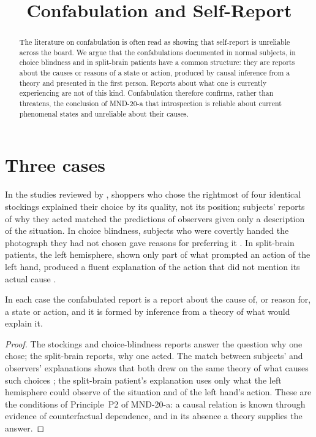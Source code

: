 \documentclass{situationist-preprint}
\title{Confabulation and Self-Report}
\begin{document}
\maketitle

\begin{abstract}
The literature on confabulation is often read as showing that self-report is unreliable across the board. We argue that the confabulations documented in normal subjects, in choice blindness and in split-brain patients have a common structure: they are reports about the causes or reasons of a state or action, produced by causal inference from a theory and presented in the first person. Reports about what one is currently experiencing are not of this kind. Confabulation therefore confirms, rather than threatens, the conclusion of MND-20-a that introspection is reliable about current phenomenal states and unreliable about their causes.
\end{abstract}

\section{Three cases}

In the studies reviewed by \citet{Nisbett1977}, shoppers who chose the rightmost of four identical stockings explained their choice by its quality, not its position; subjects' reports of why they acted matched the predictions of observers given only a description of the situation. In choice blindness, subjects who were covertly handed the photograph they had not chosen gave reasons for preferring it \citep{Johansson2005}. In split-brain patients, the left hemisphere, shown only part of what prompted an action of the left hand, produced a fluent explanation of the action that did not mention its actual cause \citep{Gazzaniga1978}.

\begin{proposition}\label{p:struct}
In each case the confabulated report is a report about the cause of, or reason for, a state or action, and it is formed by inference from a theory of what would explain it.
\end{proposition}

\begin{proof}
The stockings and choice-blindness reports answer the question why one chose; the split-brain reports, why one acted. The match between subjects' and observers' explanations shows that both drew on the same theory of what causes such choices \citep{Nisbett1977}; the split-brain patient's explanation uses only what the left hemisphere could observe of the situation and of the left hand's action. These are the conditions of Principle~P2 of MND-20-a: a causal relation is known through evidence of counterfactual dependence, and in its absence a theory supplies the answer.
\end{proof}
\end{document}

